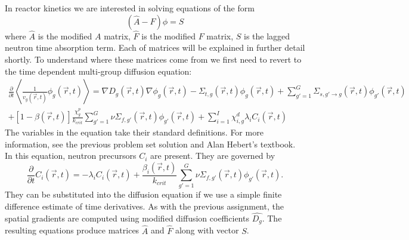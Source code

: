 \documentclass[12pt]{report}
\begin{document}
	In reactor kinetics we are interested in solving equations of the form
	\begin{equation}
	(\hat{A} - \hat{F}) \phi = S
	\end{equation}
	where $\hat{A}$ is the modified $A$ matrix, $\hat{F}$ is the modified $F$ matrix, $S$ is the lagged neutron time absorption term. Each of matrices will be explained in further detail shortly. To understand where these matrices come from we first need to revert to the time dependent multi-group diffusion equation:
	\begin{eqnarray}
	\frac{\partial}{\partial t} \left\langle \frac{1}{v_g(\vec{r},t)} \phi_g(\vec{r},t) \right\rangle = \nabla D_g(\vec{r},t) \nabla \phi_g(\vec{r},t) - \Sigma_{t,g}(\vec{r},t) \phi_g(\vec{r},t) + \sum_{g'=1}^{G} \Sigma_{s,g'\rightarrow g} (\vec{r},t) \phi_{g'}(\vec{r},t) \nonumber \\ 
	+ \left[ 1- \beta(\vec{r},t) \right] \frac{\chi_g^p}{k_{crit}} \sum_{g'=1}^{G} \nu \Sigma_{f,g'}(\vec{r},t) \phi_{g'}(\vec{r},t) + \sum_{i=1}^{I} \chi_{i,g}^d \lambda_i C_i(\vec{r},t) \nonumber
	\end{eqnarray}
	The variables in the equation take their standard definitions. For more information, see the previous problem set solution and Alan Hebert's textbook. In this equation, neutron precursors $C_i$ are present. They are governed by
	\begin{equation}
	\frac{\partial}{\partial t} C_i(\vec{r},t) = -\lambda_i C_i(\vec{r},t) + \frac{\beta_i(\vec{r},t)}{k_{crit}} \sum_{g'=1}^{G} \nu \Sigma_{f,g'}(\vec{r},t) \phi_{g'}(\vec{r},t).
	\end{equation}
	They can be substituted into the diffusion equation if we use a simple finite difference estimate of time derivatives. As with the previous assignment, the spatial gradients are computed using modified diffusion coefficients $\hat{D_g}$. The resulting equations produce matrices $\hat{A}$ and $\hat{F}$ along with vector $S$.
	
\end{document}
